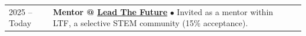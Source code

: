 \documentclass[10pt, a4paper, romans]{article}
\begin{document}
\begin{longtable}[l]{ p{} l p{}}
\makecell[l]{2025 -- Today\\ \hfill} & \makecell[l]{\textbf{ \large{Mentor @ \href{https://leadthefuture.tech}{Lead The Future}}} \\
$\bullet$ Invited as a mentor within LTF, a selective STEM community (15\% acceptance). \\
} \\



\end{longtable}

\end{document}
